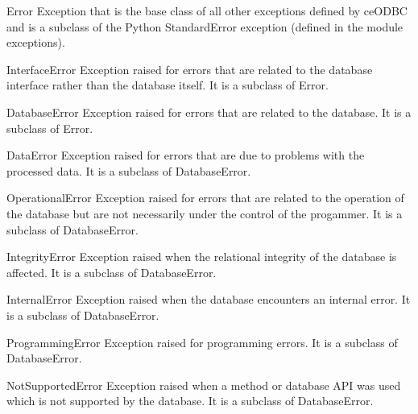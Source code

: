 \documentclass{manual}
\begin{document}
\begin{datadesc}{Error}
  Exception that is the base class of all other exceptions defined by
  ceODBC and is a subclass of the Python StandardError exception (defined in
  the module exceptions).
\end{datadesc}

\begin{datadesc}{InterfaceError}
  Exception raised for errors that are related to the database interface rather
  than the database itself. It is a subclass of Error.
\end{datadesc}

\begin{datadesc}{DatabaseError}
  Exception raised for errors that are related to the database. It is a
  subclass of Error.
\end{datadesc}

\begin{datadesc}{DataError}
  Exception raised for errors that are due to problems with the processed data.
  It is a subclass of DatabaseError.
\end{datadesc}

\begin{datadesc}{OperationalError}
  Exception raised for errors that are related to the operation of the database
  but are not necessarily under the control of the progammer. It is a
  subclass of DatabaseError.
\end{datadesc}

\begin{datadesc}{IntegrityError}
  Exception raised when the relational integrity of the database is affected.
  It is a subclass of DatabaseError.
\end{datadesc}
 
\begin{datadesc}{InternalError}
  Exception raised when the database encounters an internal error.
  It is a subclass of DatabaseError.
\end{datadesc}
 
\begin{datadesc}{ProgrammingError}
  Exception raised for programming errors. It is a subclass of DatabaseError.
\end{datadesc}
 
\begin{datadesc}{NotSupportedError}
  Exception raised when a method or database API was used which is not
  supported by the database. It is a subclass of DatabaseError.
\end{datadesc}
 
\end{document}
